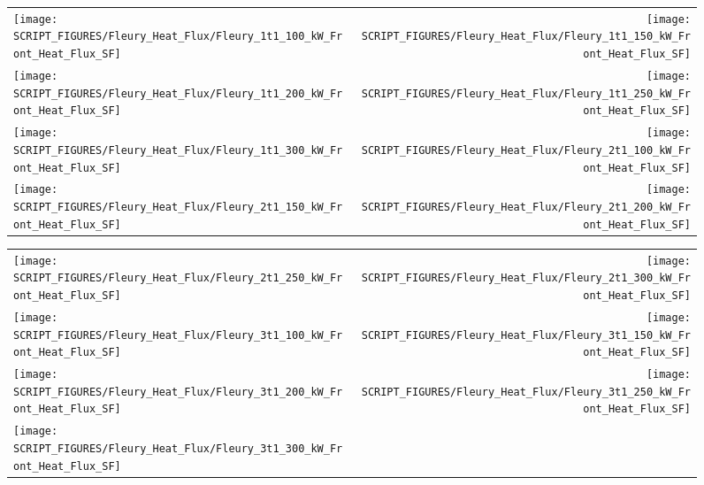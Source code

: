 \begin{figure}[!ht]
\begin{tabular*}{\textwidth}{l@{\extracolsep{\fill}}r}
\texttt{[image: SCRIPT\_FIGURES/Fleury\_Heat\_Flux/Fleury\_1t1\_100\_kW\_Front\_Heat\_Flux\_SF]} &
\texttt{[image: SCRIPT\_FIGURES/Fleury\_Heat\_Flux/Fleury\_1t1\_150\_kW\_Front\_Heat\_Flux\_SF]} \\
\texttt{[image: SCRIPT\_FIGURES/Fleury\_Heat\_Flux/Fleury\_1t1\_200\_kW\_Front\_Heat\_Flux\_SF]} &
\texttt{[image: SCRIPT\_FIGURES/Fleury\_Heat\_Flux/Fleury\_1t1\_250\_kW\_Front\_Heat\_Flux\_SF]} \\
\texttt{[image: SCRIPT\_FIGURES/Fleury\_Heat\_Flux/Fleury\_1t1\_300\_kW\_Front\_Heat\_Flux\_SF]} &
\texttt{[image: SCRIPT\_FIGURES/Fleury\_Heat\_Flux/Fleury\_2t1\_100\_kW\_Front\_Heat\_Flux\_SF]} \\
\texttt{[image: SCRIPT\_FIGURES/Fleury\_Heat\_Flux/Fleury\_2t1\_150\_kW\_Front\_Heat\_Flux\_SF]} &
\texttt{[image: SCRIPT\_FIGURES/Fleury\_Heat\_Flux/Fleury\_2t1\_200\_kW\_Front\_Heat\_Flux\_SF]}
\end{tabular*}
\end{figure}

\begin{figure}[!ht]
\begin{tabular*}{\textwidth}{l@{\extracolsep{\fill}}r}
\texttt{[image: SCRIPT\_FIGURES/Fleury\_Heat\_Flux/Fleury\_2t1\_250\_kW\_Front\_Heat\_Flux\_SF]} &
\texttt{[image: SCRIPT\_FIGURES/Fleury\_Heat\_Flux/Fleury\_2t1\_300\_kW\_Front\_Heat\_Flux\_SF]} \\
\texttt{[image: SCRIPT\_FIGURES/Fleury\_Heat\_Flux/Fleury\_3t1\_100\_kW\_Front\_Heat\_Flux\_SF]} &
\texttt{[image: SCRIPT\_FIGURES/Fleury\_Heat\_Flux/Fleury\_3t1\_150\_kW\_Front\_Heat\_Flux\_SF]} \\
\texttt{[image: SCRIPT\_FIGURES/Fleury\_Heat\_Flux/Fleury\_3t1\_200\_kW\_Front\_Heat\_Flux\_SF]} &
\texttt{[image: SCRIPT\_FIGURES/Fleury\_Heat\_Flux/Fleury\_3t1\_250\_kW\_Front\_Heat\_Flux\_SF]} \\
\texttt{[image: SCRIPT\_FIGURES/Fleury\_Heat\_Flux/Fleury\_3t1\_300\_kW\_Front\_Heat\_Flux\_SF]}
\end{tabular*}
\end{figure}

